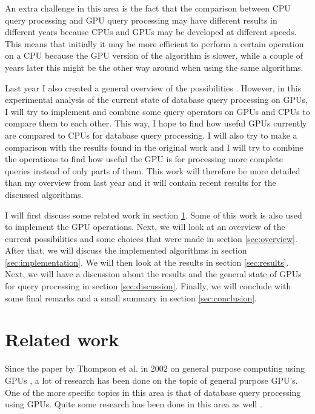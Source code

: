 \documentclass[a4paper,titlepage]{article}
\begin{document}
An extra challenge in this area is the fact that the comparison between CPU query processing and GPU query processing may have different results in different years because CPUs and GPUs may be developed at different speeds. This means that initially it may be more efficient to perform a certain operation on a CPU because the GPU version of the algorithm is slower, while a couple of years later this might be the other way around when using the same algorithms.

Last year I also created a general overview of the possibilities \cite{kostjens2015}. However, in this experimental analysis of the current state of database query processing on GPUs, I will try to implement and combine some query operators on GPUs and CPUs to compare them to each other. This way, I hope to find how useful GPUs currently are compared to CPUs for database query processing. I will also try to make a comparison with the results found in the original work and I will try to combine the operations to find how useful the GPU is for processing more complete queries instead of only parts of them. This work will therefore be more detailed than my overview from last year and it will contain recent results for the discussed algorithms.

I will first discuss some related work in section \ref{sec:related-work}. Some of this work is also used to implement the GPU operations. Next, we will look at an overview of the current possibilities and some choices that were made in section \ref{sec:overview}. After that, we will discuss the implemented algorithms in section \ref{sec:implementation}. We will then look at the results in section \ref{sec:results}. Next, we will have a discussion about the results and the general state of GPUs for query processing in section \ref{sec:discussion}. Finally, we will conclude with some final remarks and a small summary in section \ref{sec:conclusion}.

\section{Related work}
\label{sec:related-work}
Since the paper by Thompson et al. in 2002 on general purpose computing using GPUs \cite{thompson2002}, a lot of research has been done on the topic of general purpose GPU's. One of the more specific topics in this area is that of database query processing using GPUs. Quite some research has been done in this area as well \cite{bakkum2010,fang2007,kaldeway2010}. 
\end{document}
